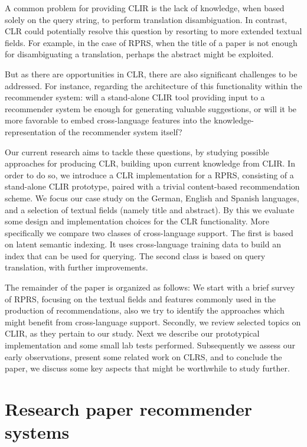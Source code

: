 \documentclass{llncs}
\begin{document}
A common problem for providing CLIR is the lack of knowledge, when based solely on the query string, to perform translation disambiguation. In contrast, CLR could potentially resolve this question by resorting to more extended textual fields. For example, in the case of RPRS, when the title of a paper is not enough for disambiguating a translation, perhaps the abstract might be exploited.

But as there are opportunities in CLR, there are also significant challenges to be addressed. For instance, regarding the architecture of this functionality within the recommender system: will a stand-alone CLIR tool providing input to a recommender system be enough for generating valuable suggestions, or will it be more favorable to embed cross-language features into the knowledge-representation of the recommender system itself? 

Our current research aims to tackle these questions, by studying possible approaches for producing CLR, building upon current knowledge from CLIR. In order to do so, we introduce a CLR implementation for a RPRS, consisting of a stand-alone CLIR prototype, paired with a trivial content-based recommendation scheme. We focus our case study on the German, English and Spanish languages, and a selection of textual fields (namely title and abstract). By this we evaluate some design and implementation choices for the CLR functionality. More specifically we compare two classes of cross-language support. The first is based on latent semantic indexing. It uses cross-language training data to build an index that can be used for querying. The second class is based on query translation, with further improvements.

The remainder of the paper is organized as follows: We start with a brief survey of RPRS, focusing on the textual fields and features commonly used in the production of recommendations, also we try to identify the approaches which might benefit from cross-language support. Secondly, we review selected topics on CLIR, as they pertain to our study. Next we describe our prototypical implementation and some small lab tests performed. Subsequently we assess our early observations, present some related work on CLRS, and to conclude the paper, we discuss some key aspects that might be worthwhile to study further.

\section{Research paper recommender systems}
\end{document}
